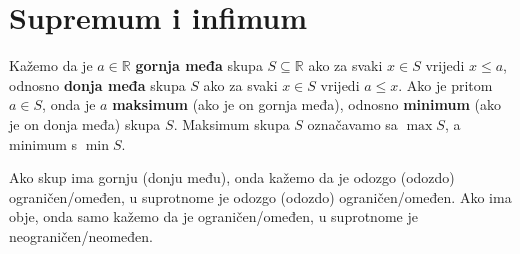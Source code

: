 \section{Supremum i infimum}
\begin{definition}
\label{minimax}
Kažemo da je \(a\in \mathbb{R}\) \textbf{gornja međa} skupa \(S\subseteq{\mathbb{R}}\) ako za svaki \(x\in S\) vrijedi \(x\leq a\), odnosno \textbf{donja međa} skupa \(S\) ako za svaki \(x\in S\) vrijedi \(a\leq x\). Ako je pritom \(a\in S\), onda je \(a\) \textbf{maksimum} (ako je on gornja međa), odnosno \textbf{minimum} (ako je on donja međa) skupa \(S\). Maksimum skupa \(S\) označavamo sa \(\max{S}\), a minimum s \(\min{S}\). 

Ako skup ima gornju (donju među), onda kažemo da je odozgo (odozdo) ograničen/omeđen, u suprotnome je odozgo (odozdo) ograničen/omeđen. Ako ima obje, onda samo kažemo da je ograničen/omeđen, u suprotnome je neograničen/neomeđen.
\end{definition}

